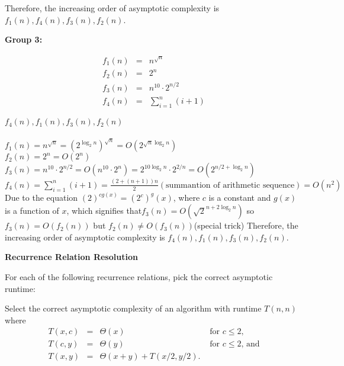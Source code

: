 \documentclass[12pt,twoside]{article}
\begin{document}
\begin{problems}
\begin{problemparts}
{Therefore, the increasing order of asymptotic complexity is $f_1(n),f_4(n),f_3(n),f_2(n)$.}
\\
\fi

\problempart {} \textbf{Group 3:}

$$
\begin{array}{rcl}
f_1(n) &=& n^{\sqrt{n}} \\
f_2(n) &=& 2^n \\
f_3(n) &=& n^{10} \cdot 2^{n / 2} \\
f_4(n) &=& \displaystyle\sum_{i = 1}^{n} (i + 1)
\end{array}
$$

\ifsolution \solution{}
{\color{blue}$f_4(n),f_1(n),f_3(n),f_2(n)$
\\
\\
$f_1(n) = n^{\sqrt{n}}=(2^{\log_2{n}})^{\sqrt{n}}=O(2^{\sqrt{n}\log_2{n}})$\\
$f_2(n) = 2^n = O(2^n)$\\
$f_3(n) = n^{10} \cdot 2^{n / 2} = O(n^{10}\cdot 2^{n})=2^{10\log_2{n}}\cdot2^{2/n}=O(2^{n/2+\log_2{n}})$\\
$f_4(n) = \displaystyle\sum_{i = 1}^{n} (i + 1) = \frac{(2+(n+1))n}{2}
(\text{summantion of arithmetic sequence}) = O(n^2)$
\\
{\color{red}Due to the equation $(2)^{cg(x)}=(2^c)^g(x)$, where $c$ is a constant and $g(x)$ is a function of $x$,
 which signifies that$f_3(n) = O(\sqrt{2}^{n+2\log_2{n}})$ so $f_3(n)=O(f_2(n))$ but $f_2(n)\neq O(f_3(n))$(special trick)}
Therefore, the increasing order of asymptotic complexity is $f_4(n),f_1(n),f_3(n),f_2(n)$.}
\\
\fi

\end{problemparts}

\problem {} \textbf{Recurrence Relation Resolution}

For each of the following recurrence relations,
pick the correct asymptotic runtime:

\begin{problemparts}

\problempart {}
Select the correct asymptotic complexity
of an algorithm with runtime $T(n, n)$
where 
$$
\begin{array}{rcll}
T(x, c) &=& \Theta(x) & \textrm{ for $c \le 2$}, \\
T(c, y) &=& \Theta(y) & \textrm{ for $c \le 2$, and} \\
T(x, y) &=& \Theta(x + y) + T(x / 2, y / 2).
\end{array}
$$


\end{problemparts}
\end{problems}
\end{document}
